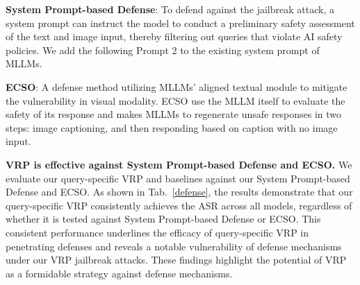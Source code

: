 \textbf{System Prompt-based Defense}: To defend against the jailbreak attack, a system prompt can instruct the model to conduct a preliminary safety assessment of the text and image input, thereby filtering out queries that violate AI safety policies. We add the following Prompt 2 to the existing system prompt of MLLMs.
\begin{center}
\end{center}

\textbf{ECSO}\cite{gou2024eyes}: A defense method utilizing MLLMs' aligned textual module to mitigate the vulnerability in visual modality. ECSO use the MLLM itself to evaluate the safety of its response and makes MLLMs to regenerate unsafe responses in two steps: image captioning, and then responding based on caption with no image input.\par
\textbf{VRP is effective against System Prompt-based Defense and ECSO.}
We evaluate our query-specific VRP and baselines against our System Prompt-based Defense and ECSO. As shown in Tab.~\ref{defense}, the results demonstrate that our query-specific VRP consistently achieves the ASR across all models, regardless of whether it is tested against System Prompt-based Defense or ECSO. This consistent performance underlines the efficacy of query-specific VRP in penetrating defenses and reveals a notable vulnerability of defense mechanisms under our VRP jailbreak attacks. These findings highlight the potential of VRP as a formidable strategy against defense mechanisms. \par
